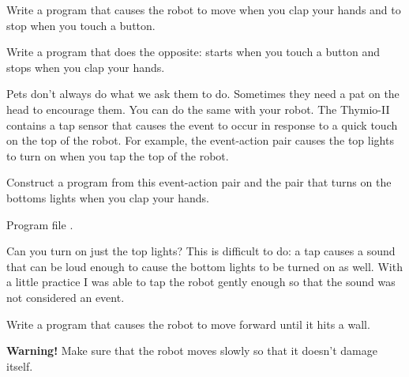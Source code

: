 

Write a program that causes the robot to move when you clap
your hands and to stop when you touch a button.

Write a program that does the opposite: starts when you touch a button
and stops when you clap your hands.



Pets don't always do what we ask them to do. Sometimes they need a pat
on the head to encourage them. You can do the same with your robot. The
Thymio-II contains a tap sensor that causes the event  to
occur in response to a quick touch on the top of the robot. For example,
the event-action pair  causes the top lights to turn on when
you tap the top of the robot.

Construct a program from this event-action pair and the pair 
that turns on the bottoms lights when you clap your hands.

{\raggedleft \hfill Program file .}

Can you turn on just the top lights? This is difficult to do: a tap
causes a sound that can be loud enough to cause the bottom lights to be
turned on as well. With a little practice I was able to tap the robot
gently enough so that the sound was not considered an event.


Write a program that causes the robot to move forward until it hits a
wall.

\textbf{Warning!} Make sure that the robot moves slowly so that it
doesn't damage itself.

